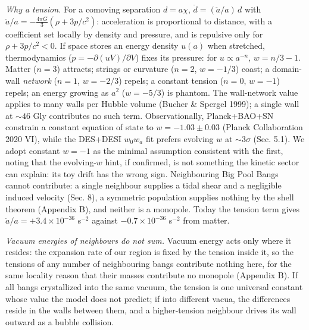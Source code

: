 \documentclass[
]{article}
\begin{document}
\emph{Why a tension.} For a comoving separation \(d = a\chi\),
\(\ddot d = (\ddot a/a)\,d\) with
\(\ddot a/a = -\tfrac{4\pi G}{3}(\rho + 3p/c^2)\): acceleration is
proportional to distance, with a coefficient set locally by density and
pressure, and is repulsive only for \(\rho + 3p/c^2 < 0\). If space
stores an energy density \(u(a)\) when stretched, thermodynamics
(\(p = -\partial(uV)/\partial V\)) fixes its pressure: for
\(u \propto a^{-n}\), \(w = n/3 - 1\). Matter (\(n=3\)) attracts;
strings or curvature (\(n=2\), \(w=-1/3\)) coast; a domain-wall
\emph{network} (\(n=1\), \(w=-2/3\)) repels; a constant tension
(\(n=0\), \(w=-1\)) repels; an energy growing as \(a^{2}\) (\(w=-5/3\))
is phantom. The wall-network value applies to many walls per Hubble
volume (Bucher \& Spergel 1999); a single wall at \(\sim\!46\) Gly
contributes no such term. Observationally, Planck+BAO+SN constrain a
constant equation of state to \(w = -1.03 \pm 0.03\) (Planck
Collaboration 2020 VI), while the DES+DESI \(w_0w_a\) fit prefers
evolving \(w\) at \(\sim\!3\sigma\) (Sec. 5.1). We adopt constant
\(w=-1\) as the minimal assumption consistent with the first, noting
that the evolving-\(w\) hint, if confirmed, is not something the kinetic
sector can explain: its toy drift has the wrong sign. Neighbouring Big
Pool Bangs cannot contribute: a single neighbour supplies a tidal shear
and a negligible induced velocity (Sec. 8), a symmetric population
supplies nothing by the shell theorem (Appendix B), and neither is a
monopole. Today the tension term gives
\(\ddot a/a = +3.4\times10^{-36}\) s\(^{-2}\) against
\(-0.7\times10^{-36}\) s\(^{-2}\) from matter.

\emph{Vacuum energies of neighbours do not sum.} Vacuum energy acts only
where it resides: the expansion rate of our region is fixed by the
tension inside it, so the tensions of any number of neighbouring bangs
contribute nothing here, for the same locality reason that their masses
contribute no monopole (Appendix B). If all bangs crystallized into the
same vacuum, the tension is one universal constant whose value the model
does not predict; if into different vacua, the differences reside in the
walls between them, and a higher-tension neighbour drives its wall
outward as a bubble collision.
\end{document}
